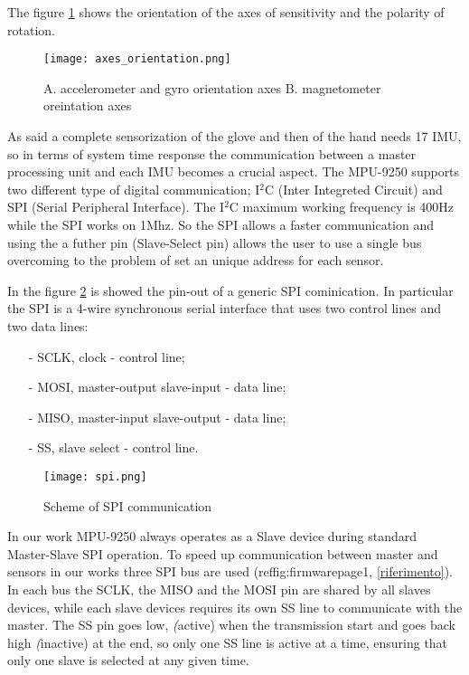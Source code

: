 The figure \ref{fig:axes} shows the orientation of the axes of sensitivity and the polarity of rotation.
\begin{figure}[h]
\centering
\texttt{[image: axes\_orientation.png]}
\caption{A. accelerometer and gyro orientation axes  B. magnetometer oreintation axes}
\label{fig:axes}
\end{figure}

As said a complete sensorization of the glove and then of the hand needs 17 IMU, so in terms of system time response the communication between a master processing unit and each IMU becomes a crucial aspect. The MPU-9250 supports two  different type of digital communication; I$^2$C (Inter Integreted Circuit) and SPI (Serial Peripheral Interface). The I$^2$C maximum working frequency is 400Hz while the SPI works on 1Mhz. So the SPI allows a faster communication and using the a futher pin (Slave-Select pin) allows the user to use a single bus overcoming to the problem of set an unique address for each sensor. 

In the figure \ref{fig:spi} is showed the pin-out of a generic SPI cominication. In particular the SPI is a 4-wire synchronous serial interface that uses two control lines and two data lines:
\begin{itemize}
\item[-] SCLK, clock - control line;
\item[-] MOSI, master-output slave-input - data line;
\item[-] MISO, master-input slave-output - data line;
\item[-] SS,   slave select - control line.
\end{itemize}

\begin{figure}[h]
\centering
\texttt{[image: spi.png]}
\caption{Scheme of SPI communication}
\label{fig:spi}
\end{figure}

In our work MPU-9250 always operates as a Slave device during standard Master-Slave SPI operation. To speed up communication between master and sensors in our works three SPI bus are used (reffig:firmwarepage1{}, \ref{riferimento}).  
In each bus the SCLK, the MISO and the MOSI pin are shared by all slaves devices, while each slave devices requires its own SS line to communicate with the master. The SS pin goes low, \textit(active) when the transmission start and goes back high \textit(inactive) at the end, so only one SS line is active at a time, ensuring that only one slave is selected at any given time.   

